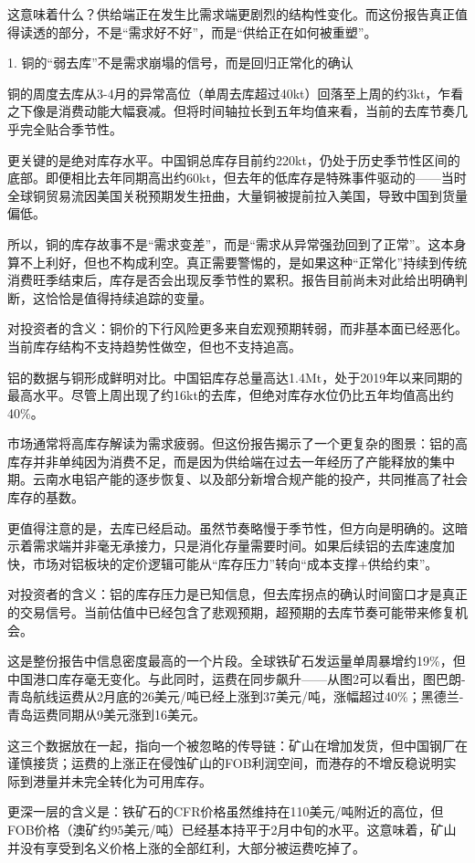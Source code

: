 \documentclass[11pt]{ctexart}
\begin{document}
这意味着什么？供给端正在发生比需求端更剧烈的结构性变化。而这份报告真正值得读透的部分，不是“需求好不好”，而是“供给正在如何被重塑”。

1. 铜的“弱去库”不是需求崩塌的信号，而是回归正常化的确认

铜的周度去库从3-4月的异常高位（单周去库超过40kt）回落至上周的约3kt，乍看之下像是消费动能大幅衰减。但将时间轴拉长到五年均值来看，当前的去库节奏几乎完全贴合季节性。

更关键的是绝对库存水平。中国铜总库存目前约220kt，仍处于历史季节性区间的底部。即便相比去年同期高出约60kt，但去年的低库存是特殊事件驱动的——当时全球铜贸易流因美国关税预期发生扭曲，大量铜被提前拉入美国，导致中国到货量偏低。

所以，铜的库存故事不是“需求变差”，而是“需求从异常强劲回到了正常”。这本身算不上利好，但也不构成利空。真正需要警惕的，是如果这种“正常化”持续到传统消费旺季结束后，库存是否会出现反季节性的累积。报告目前尚未对此给出明确判断，这恰恰是值得持续追踪的变量。

对投资者的含义：铜价的下行风险更多来自宏观预期转弱，而非基本面已经恶化。当前库存结构不支持趋势性做空，但也不支持追高。

铝的数据与铜形成鲜明对比。中国铝库存总量高达1.4Mt，处于2019年以来同期的最高水平。尽管上周出现了约16kt的去库，但绝对库存水位仍比五年均值高出约40\%。

市场通常将高库存解读为需求疲弱。但这份报告揭示了一个更复杂的图景：铝的高库存并非单纯因为消费不足，而是因为供给端在过去一年经历了产能释放的集中期。云南水电铝产能的逐步恢复、以及部分新增合规产能的投产，共同推高了社会库存的基数。

更值得注意的是，去库已经启动。虽然节奏略慢于季节性，但方向是明确的。这暗示着需求端并非毫无承接力，只是消化存量需要时间。如果后续铝的去库速度加快，市场对铝板块的定价逻辑可能从“库存压力”转向“成本支撑+供给约束”。

对投资者的含义：铝的库存压力是已知信息，但去库拐点的确认时间窗口才是真正的交易信号。当前估值中已经包含了悲观预期，超预期的去库节奏可能带来修复机会。

这是整份报告中信息密度最高的一个片段。全球铁矿石发运量单周暴增约19\%，但中国港口库存毫无变化。与此同时，运费在同步飙升——从图2可以看出，图巴朗-青岛航线运费从2月底的26美元/吨已经上涨到37美元/吨，涨幅超过40\%；黑德兰-青岛运费同期从9美元涨到16美元。

这三个数据放在一起，指向一个被忽略的传导链：矿山在增加发货，但中国钢厂在谨慎接货；运费的上涨正在侵蚀矿山的FOB利润空间，而港存的不增反稳说明实际到港量并未完全转化为可用库存。

更深一层的含义是：铁矿石的CFR价格虽然维持在110美元/吨附近的高位，但FOB价格（澳矿约95美元/吨）已经基本持平于2月中旬的水平。这意味着，矿山并没有享受到名义价格上涨的全部红利，大部分被运费吃掉了。
\end{document}
